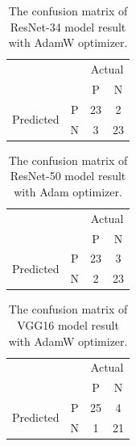 \begin{table}[!h]
\centering
\caption{The confusion matrix of ResNet-34 model result with AdamW optimizer.}
\label{tab:conf_resnet34}
\begin{tabular}{cc|c|c|}
\cline{3-4}
                                                 &   & \multicolumn{2}{c|}{Actual} \\ \cline{3-4} 
                                                 &   & P            & N            \\ \hline
\multicolumn{1}{|c|}{\multirow{2}{*}{Predicted}} & P & 23           & 2            \\ \cline{2-4} 
\multicolumn{1}{|c|}{}                           & N & 3            & 23           \\ \hline
\end{tabular}
\end{table}

\begin{table}[!h]
\centering
\caption{The confusion matrix of ResNet-50 model result with Adam optimizer.}
\label{tab:conf_resnet50}
\begin{tabular}{cc|c|c|}
\cline{3-4}
                                                 &   & \multicolumn{2}{c|}{Actual} \\ \cline{3-4} 
                                                 &   & P            & N            \\ \hline
\multicolumn{1}{|c|}{\multirow{2}{*}{Predicted}} & P & 23           & 3            \\ \cline{2-4} 
\multicolumn{1}{|c|}{}                           & N & 2            & 23           \\ \hline
\end{tabular}
\end{table}

\begin{table}[!h]
\centering
\caption{The confusion matrix of VGG16 model result with AdamW optimizer.}
\label{tab:conf_vgg16}
\begin{tabular}{cc|c|c|}
\cline{3-4}
                                                 &   & \multicolumn{2}{c|}{Actual} \\ \cline{3-4} 
                                                 &   & P            & N            \\ \hline
\multicolumn{1}{|c|}{\multirow{2}{*}{Predicted}} & P & 25           & 4            \\ \cline{2-4} 
\multicolumn{1}{|c|}{}                           & N & 1            & 21           \\ \hline
\end{tabular}
\end{table}

